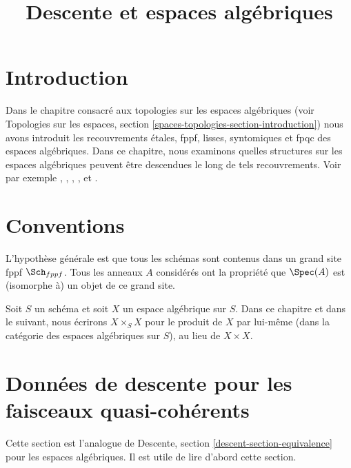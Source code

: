 

%


\title{Descente et espaces algébriques}

\maketitle

\label{section-phantom}

\tableofcontents

\section{Introduction}
\label{section-introduction}

\noindent
Dans le chapitre consacré aux topologies sur les espaces algébriques (voir
Topologies sur les espaces, section \ref{spaces-topologies-section-introduction})
nous avons introduit les recouvrements \'etales, fppf, lisses, syntomiques et fpqc des
espaces algébriques.
Dans ce chapitre, nous examinons quelles structures sur les espaces algébriques
peuvent être descendues le long de tels recouvrements.
Voir par exemple \cite{Gr-I}, \cite{Gr-II}, \cite{Gr-III},
\cite{Gr-IV}, \cite{Gr-V} et \cite{Gr-VI}.



\section{Conventions}
\label{section-conventions}

\noindent
L'hypothèse générale est que tous les schémas sont contenus dans
un grand site fppf $\Sch_{fppf}$. Tous les anneaux $A$ considérés
ont la propriété que $\Spec(A)$ est (isomorphe à) un
objet de ce grand site.

\medskip\noindent
Soit $S$ un schéma et soit $X$ un espace algébrique sur $S$.
Dans ce chapitre et dans le suivant, nous écrirons $X \times_S X$
pour le produit de $X$ par lui-même (dans la catégorie des espaces algébriques
sur $S$), au lieu de $X \times X$.






\section{Données de descente pour les faisceaux quasi-cohérents}
\label{section-equivalence}

\noindent
Cette section est l'analogue de
Descente, section \ref{descent-section-equivalence}
pour les espaces algébriques.
Il est utile de lire d'abord cette section.


